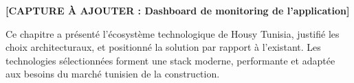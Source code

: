 \textbf{[CAPTURE À AJOUTER : Dashboard de monitoring de l'application]}

\begin{resultbox}
Ce chapitre a présenté l'écosystème technologique de Housy Tunisia, justifié les choix architecturaux, et positionné la solution par rapport à l'existant. Les technologies sélectionnées forment une stack moderne, performante et adaptée aux besoins du marché tunisien de la construction.
\end{resultbox}
